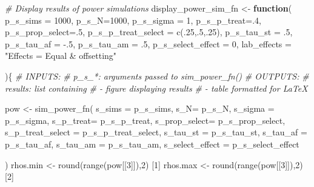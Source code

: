 \documentclass[
]{article}
\newenvironment{Shaded}{\begin{snugshade}}{\end{snugshade}}
\newcommand{\AttributeTok}[1]{\textcolor[rgb]{0.77,0.63,0.00}{#1}}
\newcommand{\CommentTok}[1]{\textcolor[rgb]{0.56,0.35,0.01}{\textit{#1}}}
\newcommand{\ControlFlowTok}[1]{\textcolor[rgb]{0.13,0.29,0.53}{\textbf{#1}}}
\newcommand{\DecValTok}[1]{\textcolor[rgb]{0.00,0.00,0.81}{#1}}
\newcommand{\FunctionTok}[1]{\textcolor[rgb]{0.00,0.00,0.00}{#1}}
\newcommand{\NormalTok}[1]{#1}
\newcommand{\OtherTok}[1]{\textcolor[rgb]{0.56,0.35,0.01}{#1}}
\newcommand{\SpecialCharTok}[1]{\textcolor[rgb]{0.00,0.00,0.00}{#1}}
\newcommand{\StringTok}[1]{\textcolor[rgb]{0.31,0.60,0.02}{#1}}
\begin{document}
\begin{Shaded}
\begin{Highlighting}[]
\CommentTok{\# Display results of power simulations}
\NormalTok{display\_power\_sim\_fn }\OtherTok{\textless{}{-}} \ControlFlowTok{function}\NormalTok{(}
  \AttributeTok{p\_s\_sims =} \DecValTok{1000}\NormalTok{,}
  \AttributeTok{p\_s\_N=}\DecValTok{1000}\NormalTok{, }
  \AttributeTok{p\_s\_sigma =} \DecValTok{1}\NormalTok{,}
  \AttributeTok{p\_s\_p\_treat=}\NormalTok{.}\DecValTok{4}\NormalTok{, }
  \AttributeTok{p\_s\_prop\_select=}\NormalTok{.}\DecValTok{5}\NormalTok{, }
  \AttributeTok{p\_s\_p\_treat\_select =} \FunctionTok{c}\NormalTok{(.}\DecValTok{25}\NormalTok{,.}\DecValTok{5}\NormalTok{,.}\DecValTok{25}\NormalTok{), }
  \AttributeTok{p\_s\_tau\_st =}\NormalTok{ .}\DecValTok{5}\NormalTok{, }
  \AttributeTok{p\_s\_tau\_af =} \SpecialCharTok{{-}}\NormalTok{.}\DecValTok{5}\NormalTok{,}
  \AttributeTok{p\_s\_tau\_am =}\NormalTok{ .}\DecValTok{5}\NormalTok{,}
  \AttributeTok{p\_s\_select\_effect =} \DecValTok{0}\NormalTok{,}
  \AttributeTok{lab\_effects =} \StringTok{"Effects = Equal \& offsetting"}
  
\NormalTok{)\{}
  \CommentTok{\# INPUTS:}
  \CommentTok{\# p\_s\_*: arguments passed to sim\_power\_fn()}
  \CommentTok{\# OUTPUTS:}
  \CommentTok{\# results: list containing }
  \CommentTok{\#           {-} figure displaying results}
  \CommentTok{\#           {-} table formatted for LaTeX}

\NormalTok{  pow }\OtherTok{\textless{}{-}} \FunctionTok{sim\_power\_fn}\NormalTok{(}
    \AttributeTok{s\_sims =}\NormalTok{ p\_s\_sims,}
    \AttributeTok{s\_N=}\NormalTok{ p\_s\_N,}
    \AttributeTok{s\_sigma =}\NormalTok{ p\_s\_sigma,}
    \AttributeTok{s\_p\_treat=}\NormalTok{ p\_s\_p\_treat,}
    \AttributeTok{s\_prop\_select=}\NormalTok{ p\_s\_prop\_select,}
    \AttributeTok{s\_p\_treat\_select =}\NormalTok{ p\_s\_p\_treat\_select,}
    \AttributeTok{s\_tau\_st =}\NormalTok{ p\_s\_tau\_st,}
    \AttributeTok{s\_tau\_af =}\NormalTok{ p\_s\_tau\_af,}
    \AttributeTok{s\_tau\_am =}\NormalTok{ p\_s\_tau\_am,}
    \AttributeTok{s\_select\_effect =}\NormalTok{ p\_s\_select\_effect}
    
    
\NormalTok{  )}
\NormalTok{  rhos.min }\OtherTok{\textless{}{-}} \FunctionTok{round}\NormalTok{(}\FunctionTok{range}\NormalTok{(pow[[}\DecValTok{3}\NormalTok{]]),}\DecValTok{2}\NormalTok{) [}\DecValTok{1}\NormalTok{]}
\NormalTok{  rhos.max }\OtherTok{\textless{}{-}} \FunctionTok{round}\NormalTok{(}\FunctionTok{range}\NormalTok{(pow[[}\DecValTok{3}\NormalTok{]]),}\DecValTok{2}\NormalTok{) [}\DecValTok{2}\NormalTok{]}
  

\end{Highlighting}
\end{Shaded}
\end{document}

